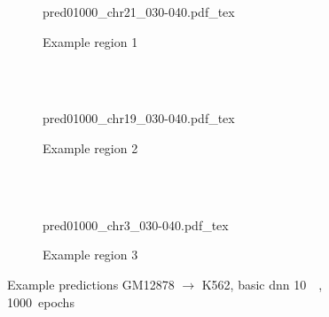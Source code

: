 \begin{figure}[p]
    \begin{subfigure}{\textwidth}
        \centering
        \scriptsize
        {pred01000_chr21_030-040.pdf_tex}
        \caption{Example  region 1} \label{fig:results:basic10k_r1}
    \end{subfigure}\\[2mm]
    \\[3mm]
    \begin{subfigure}{\textwidth}
        \centering
        \scriptsize
        {pred01000_chr19_030-040.pdf_tex}
        \caption{Example region 2} \label{fig:results:basic10k_r2}
    \end{subfigure}\\[2mm]
    \\[3mm]
    \begin{subfigure}{\textwidth}
        \centering
        \scriptsize
        {pred01000_chr3_030-040.pdf_tex}
        \caption{Example region 3} \label{fig:results:basic10k_r3}
    \end{subfigure}
    \caption{Example predictions GM12878 $\rightarrow$ K562, basic \acrshort{dnn} \SI{10}{\kilo\bp}, 1000~epochs}
\end{figure}

